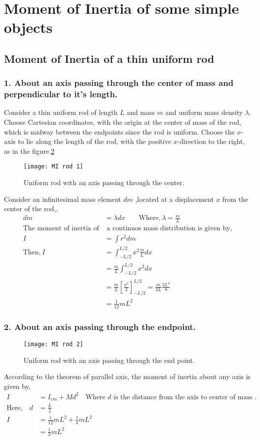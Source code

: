 \section{Moment of Inertia of some simple objects}

\subsection{Moment of Inertia of a thin uniform rod }
\subsubsection{1. About an axis passing through the center of mass and perpendicular to it's length.}
Consider a thin uniform rod of length $L$ and mass $m$ and uniform mass density $\lambda$.  Choose Cartesian coordinates, with the origin at the center of mass of the rod, which is midway between the endpoints since the rod is uniform. Choose the $x$-axis to lie along the length of the rod, with the positive $x$-direction to the right, as in the figure.\ref{Uniform rod}
\begin{figure}[H]
	\centering
	\texttt{[image: MI rod 1]}
	\caption{Uniform rod with an axis passing through the center.}
	\label{Uniform rod}
\end{figure}
Consider an infinitesimal mass element  $dm$ ,located at a displacement  $x$  from the center  of  the  rod,, 
\begin{align*}
dm&= \lambda dx \qquad \text{Where,}\ \lambda=\frac{m}{L}\\
\text{The moment of inertia of}&\text{ a continuos mass distribution is given by,}\\ I&= \int r^{2} d m\\
\text{Then,}\ I&=\int_{-L/2}^{L/2} x^{2} \frac{m}{L}dx\\&= \frac{m}{L} \int_{-L/2}^{L/2} x^{2} dx\\&=
\frac{m}{L} \left[\frac{x^{3}}{3} \right]_{-L/2}^{L/2} =\frac{m}{3L} \frac{2L^{3}}{8} \\&=\frac{1}{12}mL^{2}
\end{align*}
\subsubsection{2.  About an axis passing  through  the  endpoint. }
\begin{figure}[H]
	\centering
	\texttt{[image: MI rod 2]}
	\caption{Uniform rod with an axis passing through the end point.}
	\label{Uniform rod}
\end{figure}
According to the theorem of parallel axis, the moment of inertia about any axis is given by,
\begin{align*}
I&= I_{cm}+M d^{2}\quad  \text{Where $d$ is the distance from the axis to center of mass .}\\
\text{Here,}\quad d&=\frac{L}{2}\\
I&=\frac{1}{12} m L^{2}+\frac{1}{4} m L^{2}\\&=\frac{1}{3} m L^{2} 
\end{align*}
